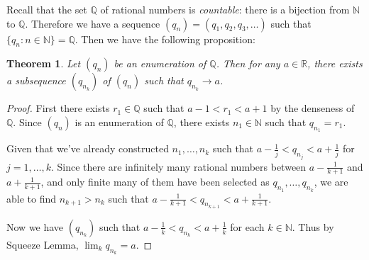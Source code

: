 \documentclass[12pt, lettersize]{book}
\theoremstyle{plain}
\newtheorem{thm}{Theorem}[section]
\theoremstyle{definition}
\theoremstyle{remark}
\newcommand{\R}{\mathbb{R}}
\newcommand{\N}{\mathbb{N}}
\newcommand{\Q}{\mathbb{Q}}
\begin{document}
		Recall that the set $\Q$ of rational numbers is \emph{countable}: there is a bijection from $\N$ to $\Q$. Therefore we have a sequence $(q_n)=(q_1,q_2,q_3,\dots)$ such that $\{q_n: n\in\N\}=\Q$. Then we have the following proposition:
		\begin{thm}
		Let $(q_n)$ be an enumeration of $\Q$. Then for any $a\in\R$, there exists a subsequence $(q_{n_k})$ of $(q_n)$ such that $q_{n_k}\rightarrow a$.
		\end{thm}
		\begin{proof}
		First there exists $r_1\in\Q$ such that $a-1<r_1<a+1$ by the denseness of $\Q$. Since $(q_n)$ is an enumeration of $\Q$, there exists $n_1\in\N$ such that $q_{n_1}=r_1$.
		
		Given that we've already constructed $n_1,\dots,n_k$ such that $a-\frac{1}{j}<q_{n_j}<a+\frac{1}{j}$ for $j=1,\dots,k$. Since there are infinitely many rational numbers between $a-\frac{1}{k+1}$ and $a+\frac{1}{k+1}$, and only finite many of them have been selected as $q_{n_1},\dots,q_{n_k}$, we are able to find $n_{k+1}>n_k$ such that $a-\frac{1}{k+1}<q_{n_{k+1}}<a+\frac{1}{k+1}$. 
		
		Now we have $(q_{n_k})$ such that $a-\frac{1}{k}<q_{n_k}<a+\frac{1}{k}$ for each $k\in\N$. Thus by Squeeze Lemma, $\lim_k q_{n_k}=a$.
		\end{proof}
	
\end{document}
